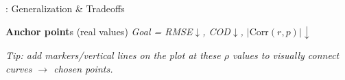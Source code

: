 \documentclass[aspectratio=169,10pt]{beamer}
\begin{document}
\begin{frame}{\sectionY: Generalization \& Tradeoffs}
\begin{block}{  \footnotesize {} \textbf{Anchor point}s (real values) \;\; \textit{Goal = RMSE$\downarrow$, COD$\downarrow$, $|\mathrm{Corr}(r,p)|\downarrow$}}


\vspace{0.5mm}
\footnotesize
\textit{Tip: add markers/vertical lines on the plot at these $\rho$ values to visually connect curves $\rightarrow$ chosen points.}
\end{block}

\end{frame}



\newcommand{\sectionF}{Conclusions}
\end{document}
